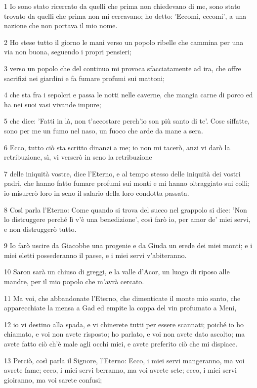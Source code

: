 \par 1 Io sono stato ricercato da quelli che prima non chiedevano di me, sono stato trovato da quelli che prima non mi cercavano; ho detto: 'Eccomi, eccomi', a una nazione che non portava il mio nome.
\par 2 Ho stese tutto il giorno le mani verso un popolo ribelle che cammina per una via non buona, seguendo i propri pensieri;
\par 3 verso un popolo che del continuo mi provoca sfacciatamente ad ira, che offre sacrifizi nei giardini e fa fumare profumi sui mattoni;
\par 4 che sta fra i sepolcri e passa le notti nelle caverne, che mangia carne di porco ed ha nei suoi vasi vivande impure;
\par 5 che dice: 'Fatti in là, non t'accostare perch'io son più santo di te'. Cose siffatte, sono per me un fumo nel naso, un fuoco che arde da mane a sera.
\par 6 Ecco, tutto ciò sta scritto dinanzi a me; io non mi tacerò, anzi vi darò la retribuzione, sì, vi verserò in seno la retribuzione
\par 7 delle iniquità vostre, dice l'Eterno, e al tempo stesso delle iniquità dei vostri padri, che hanno fatto fumare profumi sui monti e mi hanno oltraggiato sui colli; io misurerò loro in seno il salario della loro condotta passata.
\par 8 Così parla l'Eterno: Come quando si trova del succo nel grappolo si dice: 'Non lo distruggere perché lì v'è una benedizione', così farò io, per amor de' miei servi, e non distruggerò tutto.
\par 9 Io farò uscire da Giacobbe una progenie e da Giuda un erede dei miei monti; e i miei eletti possederanno il paese, e i miei servi v'abiteranno.
\par 10 Saron sarà un chiuso di greggi, e la valle d'Acor, un luogo di riposo alle mandre, per il mio popolo che m'avrà cercato.
\par 11 Ma voi, che abbandonate l'Eterno, che dimenticate il monte mio santo, che apparecchiate la mensa a Gad ed empite la coppa del vin profumato a Meni,
\par 12 io vi destino alla spada, e vi chinerete tutti per essere scannati; poiché io ho chiamato, e voi non avete risposto; ho parlato, e voi non avete dato ascolto; ma avete fatto ciò ch'è male agli occhi miei, e avete preferito ciò che mi dispiace.
\par 13 Perciò, così parla il Signore, l'Eterno: Ecco, i miei servi mangeranno, ma voi avrete fame; ecco, i miei servi berranno, ma voi avrete sete; ecco, i miei servi gioiranno, ma voi sarete confusi;
